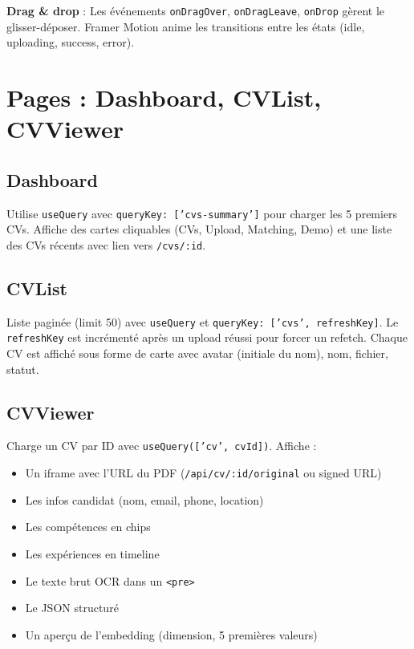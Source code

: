 \documentclass[11pt,a4paper]{report}
\begin{document}
\textbf{Drag \& drop} : Les événements \texttt{onDragOver}, \texttt{onDragLeave}, \texttt{onDrop} gèrent le glisser-déposer. Framer Motion anime les transitions entre les états (idle, uploading, success, error).

\section{Pages : Dashboard, CVList, CVViewer}

\subsection{Dashboard}

Utilise \texttt{useQuery} avec \texttt{queryKey: ['cvs-summary']} pour charger les 5 premiers CVs. Affiche des cartes cliquables (CVs, Upload, Matching, Demo) et une liste des CVs récents avec lien vers \texttt{/cvs/:id}.

\subsection{CVList}

Liste paginée (limit 50) avec \texttt{useQuery} et \texttt{queryKey: ['cvs', refreshKey]}. Le \texttt{refreshKey} est incrémenté après un upload réussi pour forcer un refetch. Chaque CV est affiché sous forme de carte avec avatar (initiale du nom), nom, fichier, statut.

\subsection{CVViewer}

Charge un CV par ID avec \texttt{useQuery(['cv', cvId])}. Affiche :
\begin{itemize}[leftmargin=*]
  \item Un iframe avec l'URL du PDF (\texttt{/api/cv/:id/original} ou signed URL)
  \item Les infos candidat (nom, email, phone, location)
  \item Les compétences en chips
  \item Les expériences en timeline
  \item Le texte brut OCR dans un \texttt{<pre>}
  \item Le JSON structuré
  \item Un aperçu de l'embedding (dimension, 5 premières valeurs)
\end{itemize}
\end{document}
